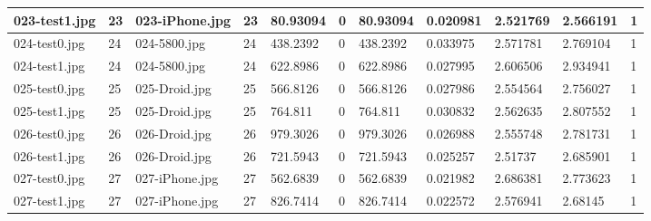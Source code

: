 \begin{landscape}
\begin{longtable}{|p{2cm}|p{1cm}|p{2cm}|p{1cm}|p{2cm}|p{1cm}|p{2cm}|p{2cm}|p{2cm}|p{2cm}|p{1cm}|}
		023-test1.jpg   & 23               & 023-iPhone.jpg        & 23                          & 80.93094              & 0                       & 80.93094                   & 0.020981              & 2.521769              & 2.566191                 & 1                \\ \hline
		024-test0.jpg   & 24               & 024-5800.jpg          & 24                          & 438.2392              & 0                       & 438.2392                   & 0.033975              & 2.571781              & 2.769104                 & 1                \\ \hline
		024-test1.jpg   & 24               & 024-5800.jpg          & 24                          & 622.8986              & 0                       & 622.8986                   & 0.027995              & 2.606506              & 2.934941                 & 1                \\ \hline
		025-test0.jpg   & 25               & 025-Droid.jpg         & 25                          & 566.8126              & 0                       & 566.8126                   & 0.027986              & 2.554564              & 2.756027                 & 1                \\ \hline
		025-test1.jpg   & 25               & 025-Droid.jpg         & 25                          & 764.811               & 0                       & 764.811                    & 0.030832              & 2.562635              & 2.807552                 & 1                \\ \hline
		026-test0.jpg   & 26               & 026-Droid.jpg         & 26                          & 979.3026              & 0                       & 979.3026                   & 0.026988              & 2.555748              & 2.781731                 & 1                \\ \hline
		026-test1.jpg   & 26               & 026-Droid.jpg         & 26                          & 721.5943              & 0                       & 721.5943                   & 0.025257              & 2.51737               & 2.685901                 & 1                \\ \hline
		027-test0.jpg   & 27               & 027-iPhone.jpg        & 27                          & 562.6839              & 0                       & 562.6839                   & 0.021982              & 2.686381              & 2.773623                 & 1                \\ \hline
		027-test1.jpg   & 27               & 027-iPhone.jpg        & 27                          & 826.7414              & 0                       & 826.7414                   & 0.022572              & 2.576941              & 2.68145                  & 1                \\ \hline

\end{longtable}
\end{landscape}
